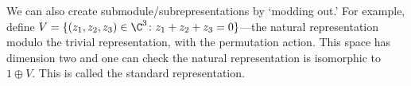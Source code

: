 We can also create submodule/subrepresentations by `modding out.' For example, define $V=\{ (z_1,z_2,z_3) \in \C^3 \colon z_1+z_2+z_3=0\}$---the natural representation modulo the trivial representation, with the permutation action. This space has dimension two and one can check the natural representation is isomorphic to $1 \oplus V$. This is called the standard representation. 































